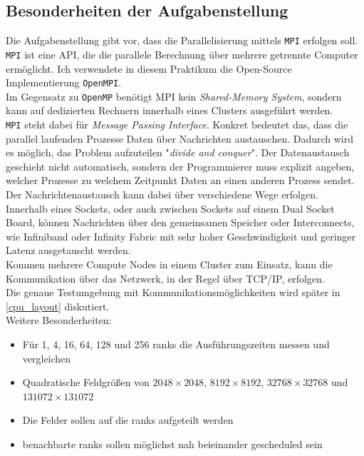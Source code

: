\documentclass[german,plainarticle,hyperref,utf8]{zihpub}
\begin{document}
	\subsection{Besonderheiten der Aufgabenstellung}
	Die Aufgabenstellung gibt vor, dass die Parallelisierung mittels \texttt{MPI} erfolgen soll. \texttt{MPI} ist eine API, die die parallele Berechnung über mehrere getrennte Computer ermöglicht. Ich verwendete in diesem Praktikum die Open-Source Implementierung \texttt{OpenMPI}.\\
	Im Gegensatz zu \texttt{OpenMP} benötigt MPI kein \textit{Shared-Memory System}, sondern kann auf dedizierten Rechnern innerhalb eines Clusters ausgeführt werden.\\
	
	\texttt{MPI} steht dabei für \textit{Message Passing Interface}. Konkret bedeutet das, dass die parallel laufenden Prozesse Daten über Nachrichten austauschen. Dadurch wird es möglich, das Problem aufzuteilen "\textit{divide and conquer}". Der Datenaustausch geschieht nicht automatisch, sondern der Programmierer muss explizit angeben, welcher Prozesse zu welchem Zeitpunkt Daten an einen anderen Prozess sendet.\\
	
	Der Nachrichtenaustausch kann dabei über verschiedene Wege erfolgen.\\
	Innerhalb eines Sockets, oder auch zwischen Sockets auf einem Dual Socket Board, können Nachrichten über den gemeinsamen Speicher oder Interconnects, wie Infiniband oder Infinity Fabric mit sehr hoher Geschwindigkeit und geringer Latenz ausgetauscht werden.\\
	Kommen mehrere Compute Nodes in einem Cluster zum Einsatz, kann die Kommunikation über das Netzwerk, in der Regel über TCP/IP, erfolgen.\\
	Die genaue Testumgebung mit Kommunikationsmöglichkeiten wird später in \ref{cpu_layout} diskutiert.\\
	
	Weitere Besonderheiten:
	\begin{itemize}
		\item Für 1, 4, 16, 64, 128 und 256 ranks die Ausführungszeiten messen und vergleichen
		\item Quadratische Feldgrößen von $2048\times 2048$, $8192\times 8192$, $32768\times 32768$ und $131072\times 131072$
		\item Die Felder sollen auf die ranks aufgeteilt werden
		\item benachbarte ranks sollen möglichst nah beieinander gescheduled sein
	\end{itemize}
\end{document}
